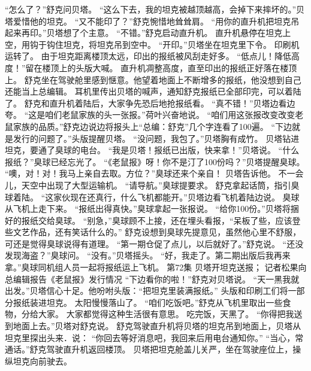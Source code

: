 \documentclass[a4paper,12pt,UTF8,twoside]{ctexbook}
\begin{document}
        “怎么了？”舒克问贝塔。 
        “这么下去，我的坦克被越顶越高，会掉下来摔坏的。”贝塔爱惜他的坦克。 
        “又不能印了？”舒克惋惜地耸耸肩。 
        “用你的直升机把坦克吊起来再印。”贝塔想了个主意。 
        “不错。”舒克启动直升机。 
        直升机悬停在坦克上空，用钩于钩住坦克，将坦克吊到空中。 
        “开印。”贝塔坐在坦克里下令。 
        印刷机运转了。 
        由于坦克距离楼顶太远，印出的报纸被风刮走好多。 
        “低点儿！降低高度！”留在楼顶上的头版大喊。 
        直升机凋整高度，直至印出的报纸正好落在楼顶上。 
        舒克坐在驾驶舱里感到惬意。他望着地面上不断增多的报纸，他没想到自己还能当上总编辑。 
        耳机里传出贝塔的喊声，通知舒克报纸已全部印完，可以着陆了。 
        舒克和直升机着陆后，大家争先恐后地抢报纸看。 
        “真不错！”贝塔边看边夸。 
        “这是咱们老鼠家族的头一张报。”荷叶兴奋地说。 
        “咱们用这张报改变改变老鼠家族的品质。”舒克边说边将报头上“总编：舒克”几个字连看了100遍。 
        “下边就是发行的问题了。”头版提醒贝塔。 
        “没问题，我包了。”贝塔胸有成竹。 
        贝塔钻进坦克，要通了臭球的电台。 
        “我是贝塔！报纸已出版，快来拿！”贝塔说。 
        “什么报纸？”臭球已经忘光了。 
        “《老鼠报》呀！你不是汀了100份吗？”贝塔提醒臭球。 
        “噢，对！对！我马上亲自去取。方位？”臭球还来个亲自！ 
        贝塔告诉他。 
        不一会儿，天空中出现了大型运输机。 
        “请导航。”臭球提要求。 
        舒克拿起话筒，指引臭球着陆。 
        “这家伙现在还真行，什么飞机都能开。”贝塔边看飞机着陆边说。 
        臭球从飞机上走下来。 
        “报纸出得真快。”臭球拿起一张报说。 
        “给你100份。”贝塔将捆好的报纸交给臭球。 
        “别急，”臭球顾不上接，还在埋头看报，“呆板了些，应该登些文艺作品，还有笑话什么的。” 
        舒克设想到臭球先提意见，虽然他心里不舒服，可还是觉得臭球说得有道理。 
        “第一期仓促了点儿，以后就好了。”舒克说。 
        “还没发现海盗？”臭球问。 
        “没有。”贝塔摇头。 
        “好，我走了。第二期出版后我再来拿。”臭球同机组人员一起将报纸运上飞机。   第72集 
        贝塔开坦克送报； 
        记者松果向总编辑报告《老鼠报》发行情况   
        “下边看你的啦！”舒克对贝塔说。 
        “天一黑我就出发。”贝塔信心十足。他吩咐头版：“把坦克里装满报纸。” 
        头版和印刷工们将一部分报纸装进坦克。 
        太阳慢慢落山了。 
        “咱们吃饭吧。”舒克从飞机里取出一些食物，分给大家。 
        大家都觉得这种生活很有意思。 
        吃完饭，天黑了。 
        “你得把我送到地面上去。”贝塔对舒克说。 
        舒克驾驶直升机将贝塔的坦克吊到地面上，贝塔从坦克里探出头来．说： 
        “你回去等好消息吧，我回来后用电台通知你。” 
        “当心，常通话。”舒克驾驶直升机返回楼顶。 
        贝塔把坦克舱盖儿关严，坐在驾驶座位上，操纵坦克向前驶去。 
\end{document}

